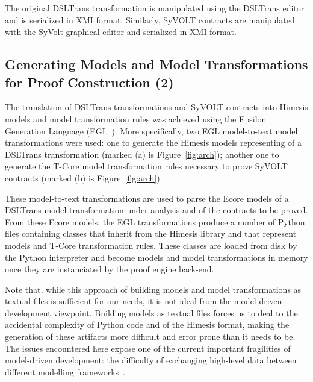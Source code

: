 The original DSLTrans transformation is manipulated using the DSLTrans editor
and is serialized in XMI format. Similarly, SyVOLT contracts are manipulated with the SyVolt graphical
editor and serialized in XMI format.


\subsection{Generating Models and Model Transformations for Proof Construction
(2)}
\label{sec:gen_models_mt}

The translation of DSLTrans transformations and SyVOLT contracts into Himesis
models and model transformation rules was achieved using the Epsilon Generation
Language (EGL~\cite{Rose2008}). More specifically, two EGL model-to-text model
transformations were used: one to generate the Himesis models
representing of a DSLTrans transformation (marked (a) is Figure~\ref{fig:arch});
another one to generate the T-Core model transformation rules necessary to prove
SyVOLT contracts (marked (b) is Figure~\ref{fig:arch}).

These model-to-text transformations are used to parse the Ecore models of a
DSLTrans model transformation under analysis and of the contracts to be proved.
From these Ecore models, the EGL transformations produce a number of Python
files containing classes that inherit from the Himesis library and that
represent models and T-Core transformation rules. These classes are loaded from
disk by the Python interpreter and become models and model transformations in
memory once they are instanciated by the proof engine back-end.

Note that, while this approach of building models and model transformations as
textual files is sufficient for our needs, it is not ideal from the model-driven
development viewpoint. Building models as textual files forces us to deal to
the accidental complexity of Python code and of the Himesis format, making the
generation of these artifacts more difficult and error prone than it needs to
be. The issues encountered here expose one of the current important fragilities
of model-driven development: the difficulty of exchanging high-level data
between different modelling frameworks~.


